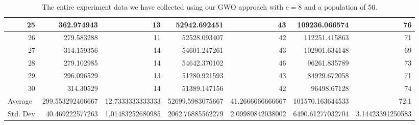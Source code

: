 \begin{table}
\begin{adjustwidth}{}{}
{{\begin{tabular}{|r|r|r|r|r|r|r|}
					\hline
					25                                         & 362.974943                   & 13                                    & 52942.692451                   & 43                                    & 109236.066574                & 76                                     \\ 
					\hline
					26                                         & 279.583288                   & 11                                    & 52528.093407                   & 42                                    & 112251.415863                & 71                                     \\ 
					\hline
					27                                         & 314.159356                   & 14                                    & 54601.247261                   & 43                                    & 102901.634148                & 69                                     \\ 
					\hline
					28                                         & 279.102985                   & 14                                    & 54642.370102                   & 46                                    & 96261.835789                 & 73                                     \\ 
					\hline
					29                                         & 296.096529                   & 13                                    & 51280.921593                   & 43                                    & 84929.672058                 & 71                                     \\ 
					\hline
					30                                         & 314.30529                    & 14                                    & 51389.147156                   & 42                                    & 96498.67128                  & 74                                     \\ 
					\hline
					\multicolumn{1}{|l|}{Average}              & 299.553292466667             & 12.7333333333333                      & 52699.5983075667               & 41.2666666666667                      & 101570.163644533             & 72.1                                   \\ 
					\hline
					\multicolumn{1}{|l|}{Std. Dev}             & 40.469222577263              & 1.01483252680985                      & 2062.76885562279               & 2.09980842038002                      & 6490.61277032704             & 3.14423391250583                       \\
					\hline
		\end{tabular}}}
	\end{adjustwidth}
	\caption{The entire experiment data we have collected using our GWO approach with $c = 8$ and a population of $50$.}
	\label{full-data-gwo-c8-p50}
\end{table}

